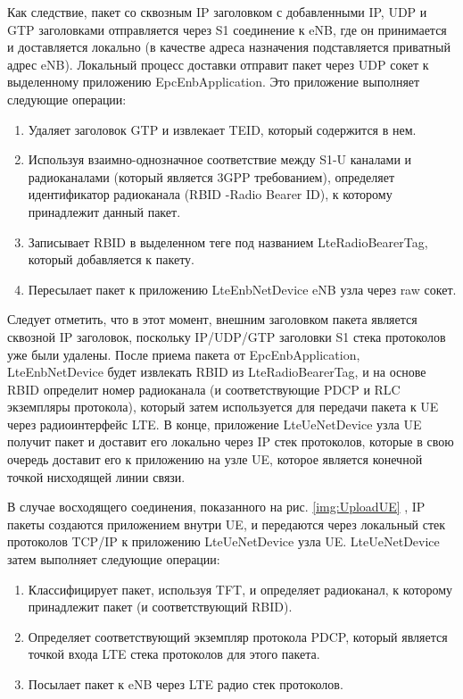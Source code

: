 Как следствие, пакет со сквозным IP заголовком с добавленными IP, 
UDP и GTP заголовками отправляется через S1 соединение к eNB, 
где он принимается и доставляется локально (в качестве адреса назначения подставляется приватный адрес eNB). Локальный процесс доставки отправит пакет через UDP сокет к выделенному приложению EpcEnbApplication. 
Это приложение выполняет следующие операции:

\begin{enumerate}
  \item Удаляет заголовок GTP и извлекает TEID, который содержится в нем.
  \item Используя взаимно-однозначное соответствие между S1-U каналами и радиоканалами (который является 3GPP требованием), определяет идентификатор радиоканала (RBID -Radio Bearer ID), к которому принадлежит данный пакет.
  \item Записывает RBID в выделенном теге под названием LteRadioBearerTag, который добавляется к пакету.
  \item Пересылает пакет к приложению LteEnbNetDevice eNB узла через raw сокет.
\end{enumerate}
Следует отметить, что в этот момент, внешним заголовком пакета является сквозной IP заголовок, поскольку IP/UDP/GTP заголовки S1 стека протоколов уже были удалены. 
После приема пакета от EpcEnbApplication, LteEnbNetDevice будет извлекать RBID из LteRadioBearerTag, и на основе RBID определит номер радиоканала (и соответствующие PDCP и RLC экземпляры протокола), 
который затем используется для передачи пакета к UE через радиоинтерфейс LTE. 
В конце, приложение LteUeNetDevice узла UE получит пакет и доставит его локально через IP стек протоколов, 
которые в свою очередь доставит его к приложению на узле UE, которое является конечной точкой нисходящей линии связи.

В случае восходящего соединения, показанного на рис. \ref{img:UploadUE} , IP пакеты создаются приложением внутри UE, и передаются через локальный стек протоколов TCP/IP к приложению LteUeNetDevice узла UE. 
LteUeNetDevice затем выполняет следующие операции:

\begin{enumerate}
  \item Классифицирует пакет, используя TFT, и определяет радиоканал, к которому принадлежит пакет (и соответствующий RBID).
  \item Определяет соответствующий экземпляр протокола PDCP, который является точкой входа LTE стека протоколов для этого пакета.
  \item Посылает пакет к eNB через LTE радио стек протоколов.
\end{enumerate}

